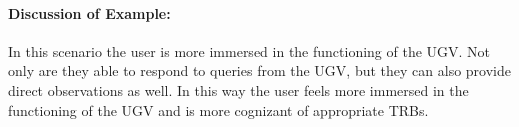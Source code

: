 \paragraph{\textbf{Discussion of Example:}} In this scenario the user is more immersed in the functioning of the UGV. Not only are they able to respond to queries from the UGV, but they can also provide direct observations as well. In this way the user feels more immersed in the functioning of the UGV and is more cognizant of appropriate TRBs.

